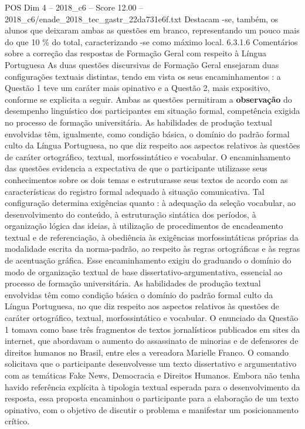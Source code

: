 \begin{textsample}{POS Dim 4 – 2018\_c6 – Score 12.00 – 2018\_c6/enade\_2018\_tec\_gastr\_22da731e6f.txt}
Destacam -se, também, os alunos que deixaram ambas as questões em branco, representando um pouco mais do que 10 \% do total, caracterizando -se como máximo local. 6.3.1.6 Comentários sobre a correção das respostas de Formação Geral com respeito à Língua Portuguesa As duas questões discursivas de Formação Geral ensejaram duas configurações textuais distintas, tendo em vista os seus encaminhamentos : a Questão 1 teve um caráter mais opinativo e a Questão 2, mais expositivo, conforme se explicita a seguir.
Ambas as questões permitiram a \textbf{observação} do desempenho linguístico dos participantes em situação formal, competência exigida no processo de formação universitária.
As habilidades de produção textual envolvidas têm, igualmente, como condição básica, o domínio do padrão formal culto da Língua Portuguesa, no que diz respeito aos aspectos relativos às questões de caráter ortográfico, textual, morfossintático e vocabular.
O encaminhamento das questões evidencia a expectativa de que o participante utilizasse seus conhecimentos sobre os dois temas e estruturasse seus textos de acordo com as características do registro formal adequado à situação comunicativa.
Tal configuração determina exigências quanto : à adequação da seleção vocabular, ao desenvolvimento do conteúdo, à estruturação sintática dos períodos, à organização lógica das ideias, à utilização de procedimentos de encadeamento textual e de referenciação, à obediência às exigências morfossintáticas próprias da modalidade escrita da norma-padrão, ao respeito às regras ortográficas e às regras de acentuação gráfica.
Esse encaminhamento exigiu do graduando o domínio do modo de organização textual de base dissertativo-argumentativa, essencial ao processo de formação universitária.
As habilidades de produção textual envolvidas têm como condição básica o domínio do padrão formal culto da Língua Portuguesa, no que diz respeito aos aspectos relativos às questões de caráter ortográfico, textual, morfossintático e vocabular.
O enunciado da Questão 1 tomava como base três fragmentos de textos jornalísticos publicados em sites da internet, que abordavam o aumento do assassinato de minorias e de defensores de direitos humanos no Brasil, entre eles a vereadora Marielle Franco.
O comando solicitava que o participante desenvolvesse um texto dissertativo e argumentativo com as temáticas Fake News, Democracia e Direitos Humanos.
Embora não tenha havido referência explícita à tipologia textual esperada para o desenvolvimento da resposta, essa proposta encaminhou o participante para a elaboração de um texto opinativo, com o objetivo de discutir o problema e manifestar um posicionamento crítico.

\end{textsample}
